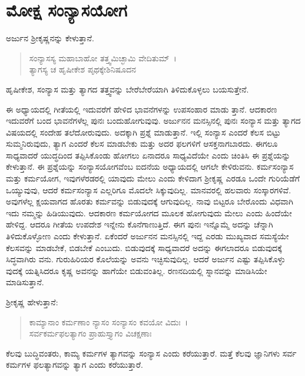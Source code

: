 
\chapter{ಮೋಕ್ಷ ಸಂನ್ಯಾಸಯೋಗ}

ಅರ್ಜುನ ಶ‍್ರೀಕೃಷ್ಣನನ್ನು ಕೇಳುತ್ತಾನೆ.

\begin{verse}
ಸಂನ್ಯಾಸಸ್ಯ ಮಹಾಬಾಹೋ ತತ್ತ್ವಮಿಚ್ಛಾಮಿ ವೇದಿತುಮ್~।\\ತ್ಯಾಗಸ್ಯ ಚ ಹೃಷೀಕೇಶ ಪೃಥಕ್ಕೇಶಿನಿಷೂದನ 
\end{verse}

{\small ಹೃಷೀಕೇಶ, ಸಂನ್ಯಾಸ ಮತ್ತು ತ್ಯಾಗದ ತತ್ತ್ವವನ್ನು ಬೇರೆಬೇರೆಯಾಗಿ ತಿಳಿದುಕೊಳ್ಳಲು ಬಯಸುತ್ತೇನೆ.}

ಈ ಅಧ್ಯಾಯದಲ್ಲಿ ಗೀತೆಯಲ್ಲಿ ಇದುವರೆಗೆ ಹೇಳಿದ ಭಾವನೆಗಳನ್ನು ಉಪಸಂಹಾರ ಮಾಡು ತ್ತಾನೆ. ಆದಕಾರಣ ಇದುವರೆಗೆ ಬಂದ ಭಾವನೆಗಳೆಲ್ಲ ಪುನಃ ಬಂದುಹೋಗುವುವು. ಅರ್ಜುನನ ಮನಸ್ಸಿನಲ್ಲಿ ಪುನಃ ಸಂನ್ಯಾಸ ಮತ್ತು ತ್ಯಾಗದ ವಿಷಯದಲ್ಲಿ ಸಂದೇಹ ತಲೆದೋರುವುದು. ಅದಕ್ಕಾಗಿ ಪ್ರಶ್ನೆ ಮಾಡುತ್ತಾನೆ. ಇಲ್ಲಿ ಸಂನ್ಯಾಸ ಎಂದರೆ ಕೆಲಸ ಬಿಟ್ಟು ಸುಮ್ಮನಿರುವುದು, ತ್ಯಾಗ ಎಂದರೆ ಕೆಲಸ ಮಾಡಬೇಕು ಮತ್ತು ಅದರ ಫಲಗಳಿಗೆ ಆಸಕ್ತನಾಗಬಾರದು. ಈಗಲೂ ಸಾಧ್ಯವಾದರೆ ಯುದ್ಧದಿಂದ ತಪ್ಪಿಸಿಕೊಂಡು ಹೋಗಲು ಏನಾದರೂ ಸಾಧ್ಯವಿದೆಯೇ ಎಂದು ಚಿಂತಿಸಿ ಈ ಪ್ರಶ್ನೆಯನ್ನು ಕೇಳುತ್ತಾನೆ. ಈ ಪ್ರಶ್ನೆಯನ್ನು ಸಂನ್ಯಾಸಯೋಗವೆಂಬ ಐದನೆಯ ಅಧ್ಯಾಯದಲ್ಲಿ ಆಗಲೇ ಕೇಳಿರುವನು. ಕರ್ಮಸಂನ್ಯಾಸ ಮತ್ತು ಕರ್ಮಯೋಗ, ಇವುಗಳೆರಡರಲ್ಲಿ ಯಾವುದು ಮೇಲು ಎಂದು ಕೇಳಿದಾಗ ಶ‍್ರೀಕೃಷ್ಣ ಎರಡೂ ಒಂದೇ ಗುರಿಯೆಡೆಗೆ ಒಯ್ಯುವುವು, ಆದರೆ ಕರ್ಮಸಂನ್ಯಾಸ ಎಲ್ಲರಿಗೂ ಮೊದಲೇ ಸಿಕ್ಕುವುದಿಲ್ಲ. ಮಾನವರಲ್ಲಿ ಹಲವಾರು ಸಂಸ್ಕಾರಗಳಿವೆ. ಅವುಗಳೆಲ್ಲ ಕ್ಷಯವಾಗದ ಹೊರತು ಕರ್ಮವನ್ನು ಬಿಡುವುದಕ್ಕೆ ಆಗುವುದಿಲ್ಲ. ನಾವು ಬಿಟ್ಟರೂ ಬೇರೊಂದು ವಿಧವಾಗಿ ಇದು ನಮ್ಮನ್ನು ಹಿಡಿಯುವುದು. ಆದಕಾರಣ ಕರ್ಮಯೋಗದ ಮೂಲಕ ಹೋಗುವುದು ಮೇಲು ಎಂದು ಹಿಂದೆಯೇ ಹೇಳಿದ್ದ. ಆದರೂ ಗೀತೆಯ ಉಪದೇಶ ಇನ್ನೇನು ಕೊನೆಗಾಣುತ್ತಿದೆ. ಈಗ ಪುನಃ ಇನ್ನೊಮ್ಮೆ ಅದನ್ನು ಚೆನ್ನಾಗಿ ತಿಳಿದುಕೊಳ್ಳೋಣ ಎಂದು ಕೇಳುತ್ತಾನೆ. ಏಕೆಂದರೆ ಅರ್ಜುನನ ಮನಸ್ಸಿನಲ್ಲಿ ಇದ್ದ ಎರಡು ಮುಖ್ಯವಾದ ಸಮಸ್ಯೆಯೇ ಕೆಲಸವನ್ನು ಮಾಡಬೇಕೆ, ಬಿಡಬೇಕೆ ಎಂಬುದು. ಬಿಡುವುದಕ್ಕೆ ಸಾಧ್ಯವಾದರೆ ಅದನ್ನು ಈಗಲಾದರೂ ಬಿಡುವುದಕ್ಕೆ ಸಿದ್ಧವಾಗಿರು ವನು. ಗುರುಹಿರಿಯರ ಕೊಲೆಯನ್ನು ಅವನು ಇಚ್ಛಿಸುವುದಿಲ್ಲ. ಆದರೆ ಅರ್ಜುನ ಎಷ್ಟು ತಪ್ಪಿಸಿಕೊಳ್ಳು ವುದಕ್ಕೆ ಯತ್ನಿಸಿದರೂ ಕೃಷ್ಣ ಅವನನ್ನು ಹಾಗೆಯೇ ಬಿಡುವಂತಿಲ್ಲ. ರಣನದಿಯಲ್ಲಿ ಸ್ನಾನವನ್ನು ಮಾಡಿಸಿಯೇ ಮಾಡಿಸುತ್ತಾನೆ.

ಶ‍್ರೀಕೃಷ್ಣ ಹೇಳುತ್ತಾನೆ:

\begin{verse}
ಕಾಮ್ಯಾನಾಂ ಕರ್ಮಣಾಂ ನ್ಯಾಸಂ ಸಂನ್ಯಾಸಂ ಕವಯೋ ವಿದುಃ~।\\ಸರ್ವಕರ್ಮಫಲತ್ಯಾಗಂ ಪ್ರಾಹುಸ್ತ್ಯಾಗಂ ವಿಚಕ್ಷಣಾಃ 
\end{verse}

{\small ಕೆಲವು ಬುದ್ಧಿವಂತರು, ಕಾಮ್ಯ ಕರ್ಮಗಳ ತ್ಯಾಗವನ್ನು ಸಂನ್ಯಾಸ ಎಂದು ಕರೆಯುತ್ತಾರೆ. ಮತ್ತೆ ಕೆಲವು ಜ್ಞಾನಿಗಳು ಸರ್ವ ಕರ್ಮಗಳ ಫಲತ್ಯಾಗವನ್ನು ತ್ಯಾಗ ಎಂದು ಕರೆಯುತ್ತಾರೆ.}

